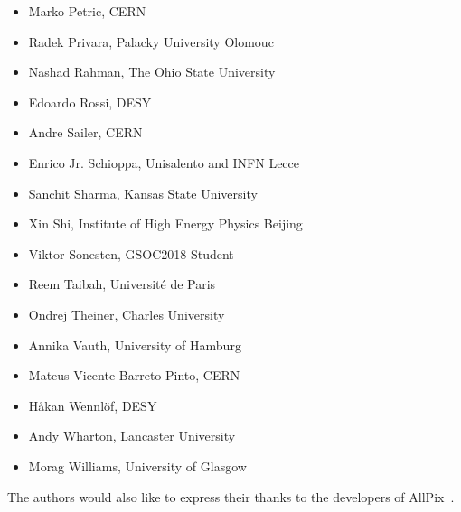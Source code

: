 \begin{itemize}
\item Marko Petric, CERN
\item Radek Privara, Palacky University Olomouc
\item Nashad Rahman, The Ohio State University
\item Edoardo Rossi, DESY
\item Andre Sailer, CERN
\item Enrico Jr. Schioppa, Unisalento and INFN Lecce
\item Sanchit Sharma, Kansas State University
\item Xin Shi, Institute of High Energy Physics Beijing
\item Viktor Sonesten, GSOC2018 Student
\item Reem Taibah, Université de Paris
\item Ondrej Theiner, Charles University
\item Annika Vauth, University of Hamburg
\item Mateus Vicente Barreto Pinto, CERN
\item Håkan Wennlöf, DESY
\item Andy Wharton, Lancaster University
\item Morag Williams, University of Glasgow
\end{itemize}

The authors would also like to express their thanks to the developers of AllPix~\cite{ap1wiki,ap1git}.
